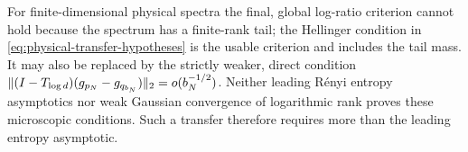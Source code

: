 For finite-dimensional physical spectra the final, global log-ratio
criterion cannot hold because the spectrum has a finite-rank tail;
the Hellinger condition in \eqref{eq:physical-transfer-hypotheses} is
the usable criterion and includes the tail mass.  It may also be
replaced by the strictly weaker, direct condition
$\lVert (I-T_{\log d})(g_{p_N}-g_{q_{b_N}})\rVert_2=o(b_N^{-1/2})$.
Neither leading R\'enyi entropy asymptotics nor weak Gaussian
convergence of logarithmic rank proves these microscopic conditions.
Such a transfer therefore requires more than the leading entropy asymptotic.
